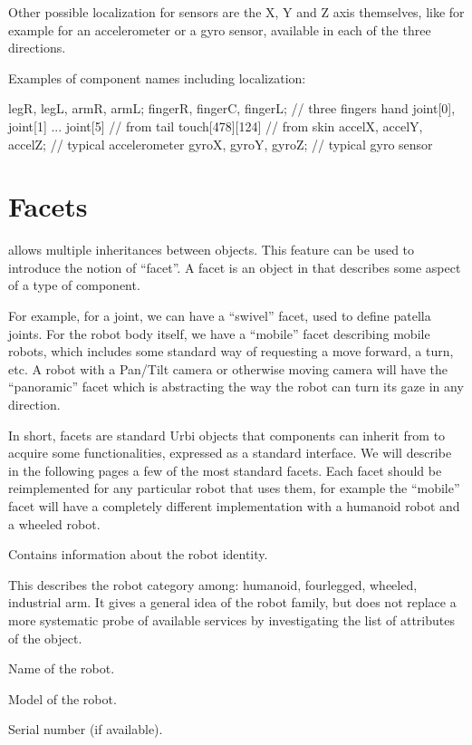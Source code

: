 Other possible localization for sensors are the X, Y and Z axis
themselves, like for example for an accelerometer or a gyro sensor,
available in each of the three directions.


Examples of component names including localization:

\begin{urbifixme}
legR, legL, armR, armL;
fingerR, fingerC, fingerL;      // three fingers hand
joint[0], joint[1] ... joint[5] // from tail
touch[478][124]                 // from skin
accelX, accelY, accelZ;         // typical accelerometer
gyroX, gyroY, gyroZ;            // typical gyro sensor
\end{urbifixme}

\section{Facets}

\urbi allows multiple inheritances between objects. This feature can be
used to introduce the notion of “facet”. A facet is an object in \urbi
that describes some aspect of a type of component.


For example, for a joint, we can have a “swivel” facet, used to define
patella joints. For the robot body itself, we have a “mobile” facet
describing mobile robots, which includes some standard way of
requesting a move forward, a turn, etc. A robot with a Pan/Tilt camera
or otherwise moving camera will have the “panoramic” facet which is
abstracting the way the robot can turn its gaze in any direction.


In short, facets are standard Urbi objects that components can inherit
from to acquire some functionalities, expressed as a standard
interface. We will describe in the following pages a few of the most
standard facets. Each facet should be reimplemented for any particular
robot that uses them, for example the “mobile” facet will have a
completely different implementation with a humanoid robot and a wheeled
robot.


Contains information about the robot identity.

\begin{slots}
  {
    This describes the robot category among: humanoid, fourlegged,
    wheeled, industrial arm. It gives a general idea of the robot
    family, but does not replace a more systematic probe of available
    services by investigating the list of attributes of the object.
  }

  {%
    Name of the robot.%
  }

  {%
    Model of the robot.%
  }

  {%
    Serial number (if available).%
  }

\end{slots}


